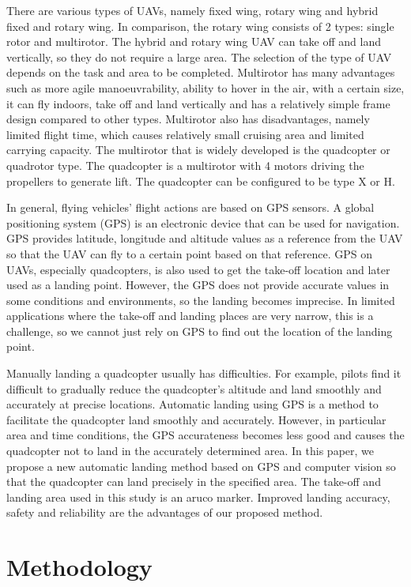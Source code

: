 \documentclass[a4paper]{jpconf}
\begin{document}
There are various types of UAVs, namely fixed wing, rotary wing and hybrid fixed and rotary wing. In comparison, the rotary wing consists of 2 types: single rotor and multirotor. The hybrid and rotary wing UAV can take off and land vertically, so they do not require a large area. The selection of the type of UAV depends on the task and area to be completed. Multirotor has many advantages such as more agile manoeuvrability, ability to hover in the air, with a certain size, it can fly indoors, take off and land vertically and has a relatively simple frame design compared to other types. Multirotor also has disadvantages, namely limited flight time, which causes relatively small cruising area and limited carrying capacity. The multirotor that is widely developed is the quadcopter or quadrotor type. The quadcopter is a multirotor with 4 motors driving the propellers to generate lift. The quadcopter can be configured to be type X or H.

In general, flying vehicles' flight actions are based on GPS sensors. A global positioning system (GPS) is an electronic device that can be used for navigation. GPS provides latitude, longitude and altitude values as a reference from the UAV so that the UAV can fly to a certain point based on that reference. GPS on UAVs, especially quadcopters, is also used to get the take-off location and later used as a landing point. However, the GPS does not provide accurate values in some conditions and environments, so the landing becomes imprecise. In limited applications where the take-off and landing places are very narrow, this is a challenge, so we cannot just rely on GPS to find out the location of the landing point.

Manually landing a quadcopter usually has difficulties. For example, pilots find it difficult to gradually reduce the quadcopter's altitude and land smoothly and accurately at precise locations. Automatic landing using GPS is a method to facilitate the quadcopter land smoothly and accurately. However, in particular area and time conditions, the GPS accurateness becomes less good and causes the quadcopter not to land in the accurately determined area\cite{ref4}. In this paper, we propose a new automatic landing method based on GPS and computer vision so that the quadcopter can land precisely in the specified area. The take-off and landing area used in this study is an aruco marker. Improved landing accuracy, safety and reliability are the advantages of our proposed method.

\section{Methodology}
\end{document}

